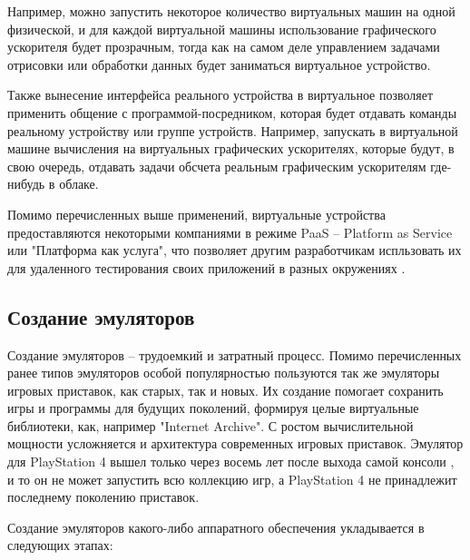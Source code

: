Например, можно запустить некоторое количество виртуальных машин на одной физической, и для каждой
виртуальной машины использование графического ускорителя будет прозрачным, тогда как на самом
деле управлением задачами отрисовки или обработки данных будет заниматься виртуальное устройство.

Также вынесение интерфейса реального устройства в виртуальное позволяет применить общение с программой-посредником,
которая будет отдавать команды реальному устройству или группе устройств.
Например, запускать в виртуальной машине вычисления на виртуальных графических ускорителях, которые
будут, в свою очередь, отдавать задачи обсчета реальным графическим ускорителям где-нибудь в облаке.

Помимо перечисленных выше применений, виртуальные устройства предоставляются некоторыми компаниями
в режиме PaaS -- Platform as Service или "Платформа как услуга", что позволяет другим разработчикам
испльзовать их для удаленного тестирования своих приложений в разных окружениях \cite{lambdatest} \cite{genymotion}.


\subsection{Создание эмуляторов}\label{sec:ch1/sec1/sub2}

Создание эмуляторов -- трудоемкий и затратный процесс. Помимо перечисленных ранее типов эмуляторов особой популярностью
пользуются так же эмуляторы игровых приставок, как старых, так и новых.
Их создание помогает сохранить игры и программы для будущих поколений, формируя целые виртуальные библиотеки, как,
например "Internet Archive"\cite{console-archive}.
С ростом вычислительной мощности усложняется и архитектура современных игровых приставок.
Эмулятор для PlayStation 4 вышел только через восемь лет после выхода самой консоли \cite{ps4-emulator}, и то
он не может запустить всю коллекцию игр, а PlayStation 4 не принадлежит последнему поколению приставок.

Создание эмуляторов какого-либо аппаратного обеспечения укладывается в следующих этапах:

